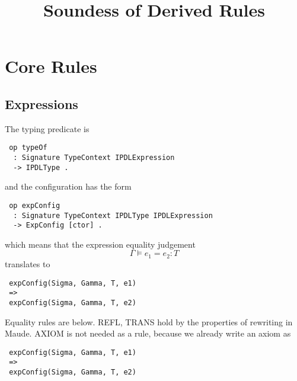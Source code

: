 \documentclass{article}
\title{Soundess of Derived Rules}
\author{ }
\date{}
\begin{document}
\maketitle

\section{Core Rules}

\subsection{Expressions}

The typing predicate is
\begin{lstlisting}
 op typeOf 
  : Signature TypeContext IPDLExpression  
  -> IPDLType .
\end{lstlisting}

\noindent and the configuration has the form

\begin{lstlisting}
 op expConfig 
  : Signature TypeContext IPDLType IPDLExpression 
  -> ExpConfig [ctor] .
\end{lstlisting}

\noindent which means that the expression equality judgement
$$\Gamma \vDash e_1 = e_2 : T$$
translates to
\begin{lstlisting}
 expConfig(Sigma, Gamma, T, e1)
 =>
 expConfig(Sigma, Gamma, T, e2) 
\end{lstlisting}

Equality rules are below. 
 REFL, TRANS hold by the properties of rewriting in Maude.
 AXIOM is not needed as a rule, because we already write an axiom as
\begin{lstlisting}
 expConfig(Sigma, Gamma, T, e1)
 =>
 expConfig(Sigma, Gamma, T, e2) 
\end{lstlisting} 
\end{document}
